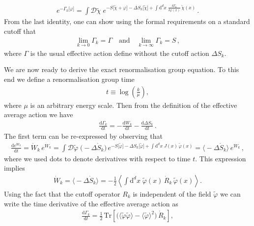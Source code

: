 \documentclass[11pt]{book}
\newcommand{\Tr}{\mathrm{Tr}}
\numberwithin{equation}{chapter}
\begin{document}
\begin{align}
  e^{ - \Gamma_k \lbrack \varphi \rbrack }
  = \int \mathcal D \tilde \chi \;
  e^{
    - S \lbrack \tilde \chi + \varphi \rbrack
    - \Delta S_k \lbrack \tilde \chi \rbrack
    + \int \mathrm d^dx \;
    \frac{ \delta \Gamma_k }{ \delta \varphi (x) }
    \, \tilde \chi(x)
  } \,.
\end{align}
From the last identity, one can show using the
formal requirements on a standard cutoff that
\begin{align}
  \lim_{k \rightarrow 0} \Gamma_k = \Gamma
  \quad \text{and} \quad
  \lim_{k \rightarrow \infty} \Gamma_k = S \,,
\end{align}
where $\Gamma$ is the usual effective action
define without the cutoff action $\Delta S_k$.

We are now ready to derive the exact renormalisation
group equation. To this end we define a renormalisation
group time
\begin{align}
  t \equiv \log \left( \frac k{\mu} \right) ,
\end{align}
where $\mu$ is an arbitrary energy scale. Then from
the definition of the effective average action we
have
\begin{align}
  \frac{ \mathrm d \Gamma_k }{ \mathrm dt }
  = - \frac{ \mathrm d W_k }{ \mathrm dt }
  - \frac{ \mathrm d \Delta S_k }{ \mathrm dt } \,.
\end{align}
The first term can be re-expressed by observing that
\begin{align}
  \frac{ \mathrm d e^{W_k} }{ \mathrm dt }
  = \dot W_k \, e^{W_k}
  = \int \mathcal D \tilde \varphi \;
  \big( - \Delta \dot S_k \big) \,
  e^{
    - S \lbrack \tilde \varphi \rbrack
    - \Delta S_k \lbrack \tilde \varphi \rbrack
    + \int \mathrm d^dx \; J(x) \, \tilde \varphi(x)
  }
  = \big\langle - \Delta \dot S_k \big\rangle \, e^{W_k} \,,
\end{align}
where we used dots to denote derivatives with respect to
time $t$. This expression implies
\begin{align}
  \dot W_k
  = \big\langle - \Delta \dot S_k \big\rangle
  = - \frac 12
  \left\langle
    \int \mathrm d^dx \; \tilde \varphi (x) \, \dot R_k \, \tilde \varphi(x)
  \right\rangle .
\end{align}
Using the fact that the cutoff operator $R_k$ is independent
of the field $\tilde \varphi$ we can write the
time derivative of the effective average action as
\begin{align}
  \frac{ \mathrm d \Gamma_k }{ \mathrm dt }
  = \frac 12 \, \Tr
  \left[
    \big(
      \langle \tilde \varphi \tilde \varphi \rangle
      - \langle \tilde \varphi \rangle ^ 2
    \big)
    \, \dot R_k
  \right] ,
\end{align}
\end{document}
